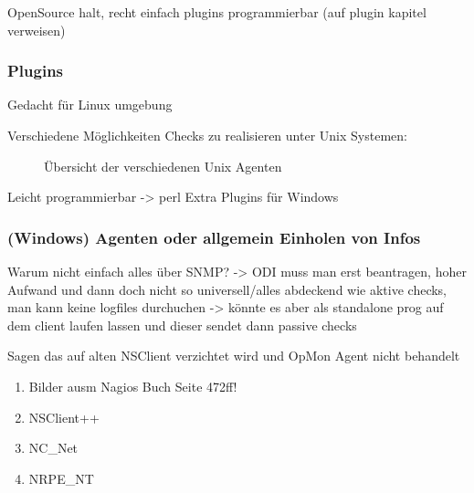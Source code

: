 OpenSource halt, recht einfach plugins programmierbar (auf plugin kapitel verweisen)





\subsubsection{Plugins}
Gedacht für Linux umgebung

Verschiedene Möglichkeiten Checks zu realisieren unter Unix Systemen:

\begin{figure}[ht]
	\centering
		\caption{Übersicht der verschiedenen Unix Agenten\protect\footnotemark}
		\label{nix-agents}
\end{figure}

Leicht programmierbar -> perl
Extra Plugins für Windows

\subsubsection{(Windows) Agenten oder allgemein Einholen von Infos}
Warum nicht einfach alles über SNMP? -> ODI muss man erst beantragen, hoher Aufwand und dann doch nicht so universell/alles abdeckend wie aktive checks, man kann keine logfiles durchuchen -> könnte es aber als standalone prog auf dem client laufen lassen und dieser sendet dann passive checks

Sagen das auf alten NSClient verzichtet wird und OpMon Agent nicht behandelt
\begin{enumerate}
\item Bilder ausm Nagios Buch Seite 472ff!
\item NSClient++
\item NC\_Net
\item NRPE\_NT
\end{enumerate}

